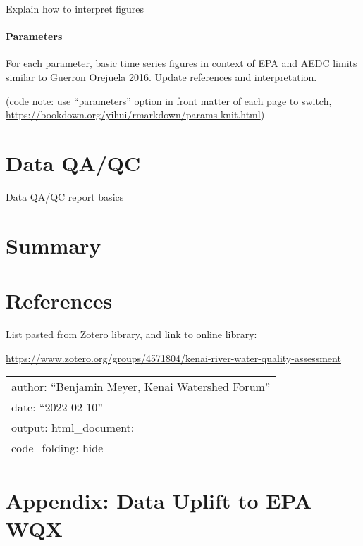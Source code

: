 \documentclass[
]{book}
\begin{document}
Explain how to interpret figures

\hypertarget{parameters}{%
\subsubsection{Parameters}\label{parameters}}

For each parameter, basic time series figures in context of EPA and AEDC limits similar to Guerron Orejuela 2016. Update references and interpretation.

(code note: use ``parameters'' option in front matter of each page to switch, \url{https://bookdown.org/yihui/rmarkdown/params-knit.html})

\hypertarget{data-qaqc}{%
\chapter{Data QA/QC}\label{data-qaqc}}

Data QA/QC report basics

\hypertarget{summary}{%
\chapter{Summary}\label{summary}}

\hypertarget{references}{%
\chapter*{References}\label{references}}

List pasted from Zotero library, and link to online library:

\url{https://www.zotero.org/groups/4571804/kenai-river-water-quality-assessment}

\begin{longtable}[]{@{}l@{}}
\toprule
\endhead
author: ``Benjamin Meyer, Kenai Watershed Forum'' \\
date: ``2022-02-10'' \\
output: html\_document: \\
code\_folding: hide \\
\bottomrule
\end{longtable}

\hypertarget{appendix-appendix}{%
\appendix}


\hypertarget{appendix-data-uplift-to-epa-wqx}{%
\chapter{Appendix: Data Uplift to EPA WQX}\label{appendix-data-uplift-to-epa-wqx}}
\end{document}
